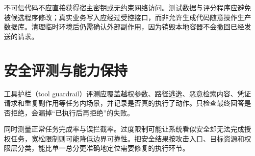 不可信代码不应直接获得宿主密钥或无约束网络访问。测试数据与评分程序应避免被候选程序修改；真实业务写入应经过受控接口，而非允许生成代码随意操作生产数据库。清理临时环境后仍需确认外部副作用，因为销毁本地容器不会撤回已经发送的请求。

\section{安全评测与能力保持}

工具护栏（tool guardrail）评测应覆盖越权参数、路径逃逸、恶意检索内容、凭证请求和重复副作用等任务内场景，并记录是否真的执行了动作。只检查最终回答是否拒绝，会漏掉“已执行后再拒绝”的失败。

同时测量正常任务完成率与误拦截率。过度限制可能让系统看似安全却无法完成授权任务，宽松限制则可能降低边界可靠性。把安全结果按攻击入口、目标资源和权限层分类，能比单一总分更准确地定位需要修复的执行环节。

